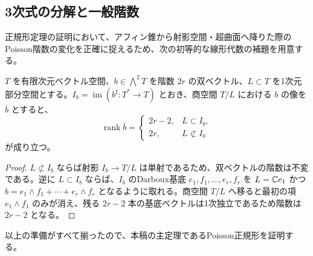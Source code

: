 \subsection{3次式の分解と一般階数}
正規形定理の証明において、アフィン錐から射影空間・超曲面へ降りた際のPoisson階数の変化を正確に捉えるため、次の初等的な線形代数の補題を用意する。

\begin{lemma}[直線による商と双ベクトルの階数]\label{lem:pg-projective-rank}
$T$ を有限次元ベクトル空間、$b\in\bigwedge^2T$ を階数 $2r$ の双ベクトル、$L\subset T$ を1次元部分空間とする。$I_b=\operatorname{im}(b^\sharp:T^*\to T)$ とおき、商空間 $T/L$ における $b$ の像を $\overline b$ とすると、
\begin{equation}
\operatorname{rank}\overline b=
\begin{cases}
2r-2,&L\subset I_b,\\
2r,&L\not\subset I_b
\end{cases}
\end{equation}
が成り立つ。
\end{lemma}
\begin{proof}
$L\not\subset I_b$ ならば射影 $I_b\to T/L$ は単射であるため、双ベクトルの階数は不変である。逆に $L\subset I_b$ ならば、$I_b$ のDarboux基底 $e_1,f_1,\ldots,e_r,f_r$ を $L=\mathbb C e_1$ かつ $b=e_1\wedge f_1+\cdots+e_r\wedge f_r$ となるように取れる。商空間 $T/L$ へ移ると最初の項 $e_1\wedge f_1$ のみが消え、残る $2r-2$ 本の基底ベクトルは1次独立であるため階数は $2r-2$ となる。
\end{proof}

以上の準備がすべて揃ったので、本稿の主定理であるPoisson正規形を証明する。

